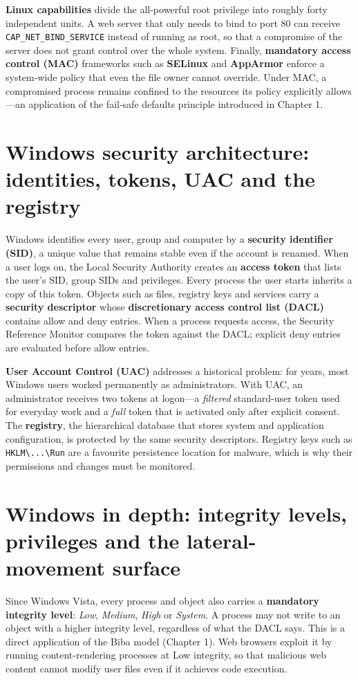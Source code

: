 \documentclass[11pt,openany]{book}
\begin{document}
\textbf{Linux capabilities} divide the all-powerful root privilege into roughly forty independent units. A web server that only needs to bind to port 80 can receive \texttt{CAP\_NET\_BIND\_SERVICE} instead of running as root, so that a compromise of the server does not grant control over the whole system. Finally, \textbf{mandatory access control (MAC)} frameworks such as \textbf{SELinux} and \textbf{AppArmor} enforce a system-wide policy that even the file owner cannot override. Under MAC, a compromised process remains confined to the resources its policy explicitly allows—an application of the fail-safe defaults principle introduced in Chapter 1.

\section{Windows security architecture: identities, tokens, UAC and the registry}\label{sec:2.4}
Windows identifies every user, group and computer by a \textbf{security identifier (SID)}, a unique value that remains stable even if the account is renamed. When a user logs on, the Local Security Authority creates an \textbf{access token} that lists the user's SID, group SIDs and privileges. Every process the user starts inherits a copy of this token. Objects such as files, registry keys and services carry a \textbf{security descriptor} whose \textbf{discretionary access control list (DACL)} contains allow and deny entries. When a process requests access, the Security Reference Monitor compares the token against the DACL; explicit deny entries are evaluated before allow entries.

\textbf{User Account Control (UAC)} addresses a historical problem: for years, most Windows users worked permanently as administrators. With UAC, an administrator receives two tokens at logon—a \emph{filtered} standard-user token used for everyday work and a \emph{full} token that is activated only after explicit consent. The \textbf{registry}, the hierarchical database that stores system and application configuration, is protected by the same security descriptors. Registry keys such as \texttt{HKLM\textbackslash{}...\textbackslash{}Run} are a favourite persistence location for malware, which is why their permissions and changes must be monitored.

\section{Windows in depth: integrity levels, privileges and the lateral-movement surface}\label{sec:2.5}
Since Windows Vista, every process and object also carries a \textbf{mandatory integrity level}: \emph{Low}, \emph{Medium}, \emph{High} or \emph{System}. A process may not write to an object with a higher integrity level, regardless of what the DACL says. This is a direct application of the Biba model (Chapter 1). Web browsers exploit it by running content-rendering processes at Low integrity, so that malicious web content cannot modify user files even if it achieves code execution.
\end{document}
